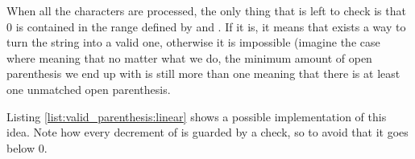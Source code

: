 When all the characters are processed, the only thing that is left to check is that $0$ is contained in the range defined by  and . If it is, it means that exists a way to turn the string into a valid one, otherwise it is impossible (imagine the case where  meaning that no matter what we do, the minimum amount of open parenthesis we end up with is still more than one meaning that there is at least one unmatched open parenthesis.

Listing \ref{list:valid_parenthesis:linear} shows a possible implementation of this idea. Note how every decrement of  is guarded by a check, so to avoid that it goes below $0$.


